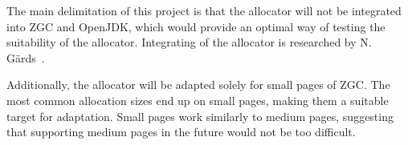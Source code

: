 
The main delimitation of this project is that the allocator will not be integrated into ZGC and OpenJDK, which would provide an optimal way of testing the suitability of the allocator. Integrating of the allocator is researched by N. Gärds~\cite{niclas}.

Additionally, the allocator will be adapted solely for small pages of ZGC. The most common allocation sizes end up on small pages, making them a suitable target for adaptation. Small pages work similarly to medium pages, suggesting that supporting medium pages in the future would not be too difficult. 

